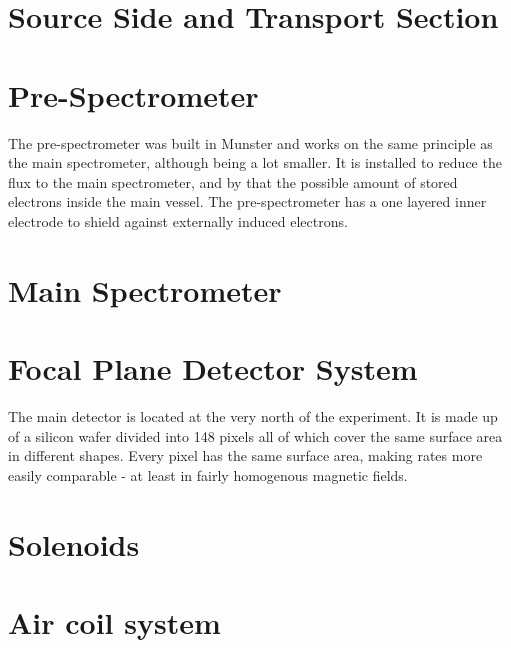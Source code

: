       \section{Source Side and Transport Section}
      \label{ch:The KATRIN experiment:sec:sourceSide}
      
      \section{Pre-Spectrometer}
      \label{ch:The KATRIN experiment:sec:PreSpectrometer}
      The pre-spectrometer was built in Munster and works on the same principle as the main spectrometer, although being a lot smaller. It is installed to reduce the flux to the main spectrometer, and by that the possible amount of stored electrons inside the main vessel. The pre-spectrometer has a one layered inner electrode to shield against externally induced electrons.
      \section{Main Spectrometer}
      \label{ch:The KATRIN experiment:sec:MainSpec}
      
      \section{Focal Plane Detector System}
      \label{ch:The KATRIN experiment:sec:mainDetectorSystem}
      The main detector is located at the very north of the experiment. It is made up of a silicon wafer divided into 148 pixels all of which cover the same surface area in different shapes. Every pixel has the same surface area, making rates more easily comparable - at least in fairly homogenous magnetic fields.
      \section{Solenoids}
      \label{ch:The KATRIN experiment:sec:solenoids}
      
      \section{Air coil system}
      \label{ch:The KATRIN experiment:sec:Air coil system}
